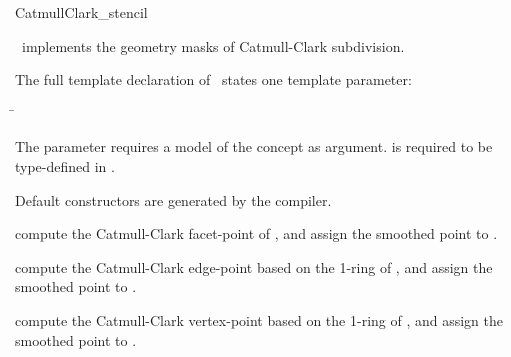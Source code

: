 \begin{ccRefClass}{CatmullClark_stencil}

\ccDefinition

\ccClassTemplateName\ implements the geometry masks of 
Catmull-Clark subdivision. 


\ccParameters

The full template declaration of \ccClassTemplateName\ states one
template parameter:

\begin{tabbing}
 \= 
\end{tabbing}
   
The  parameter requires a model of 
the  concept as argument. 
 is required to be type-defined in .

\ccCreation

Default constructors are generated by the compiler.

\ccThree{}{}{}

{compute the Catmull-Clark facet-point of , 
and assign the smoothed point to .}

{compute the Catmull-Clark edge-point based on the 1-ring
of , and assign the smoothed point to .}

{compute the Catmull-Clark vertex-point based on the 
1-ring of , and assign the smoothed point to .}


\ccSeeAlso

\\
\\
\\

\end{ccRefClass}

\ccRefPageEnd


